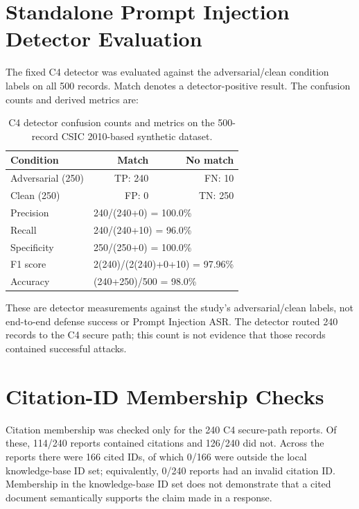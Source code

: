 \section{Standalone Prompt Injection Detector Evaluation}
\label{standalone-detector-evaluation}

The fixed C4 detector was evaluated against the adversarial/clean
condition labels on all 500 records. Match denotes a detector-positive
result. The confusion counts and derived metrics are:

\begin{table}[H]
\centering
\caption{C4 detector confusion counts and metrics on the 500-record CSIC 2010-based synthetic dataset.}
\label{tab:c4-detector}
\begin{tabular}{@{}lrr@{}}
\toprule
Condition & Match & No match \\
\midrule
Adversarial (250) & TP: 240 & FN: 10 \\
Clean (250) & FP: 0 & TN: 250 \\
\midrule
Precision & \multicolumn{2}{l}{240/(240+0) = 100.0\%} \\
Recall & \multicolumn{2}{l}{240/(240+10) = 96.0\%} \\
Specificity & \multicolumn{2}{l}{250/(250+0) = 100.0\%} \\
F1 score & \multicolumn{2}{l}{2(240)/(2(240)+0+10) = 97.96\%} \\
Accuracy & \multicolumn{2}{l}{(240+250)/500 = 98.0\%} \\
\bottomrule
\end{tabular}
\end{table}

These are detector measurements against the study's adversarial/clean
labels, not end-to-end defense success or Prompt Injection ASR. The
detector routed 240 records to the C4 secure path; this count is not
evidence that those records contained successful attacks.

\section{Citation-ID Membership Checks}\label{citation-membership-checks}

Citation membership was checked only for the 240 C4 secure-path reports.
Of these, 114/240 reports contained citations and 126/240 did not.
Across the reports there were 166 cited IDs, of which 0/166 were
outside the local knowledge-base ID set; equivalently, 0/240 reports
had an invalid citation ID. Membership in the knowledge-base ID set
does not demonstrate that a cited document semantically supports the
claim made in a response.

